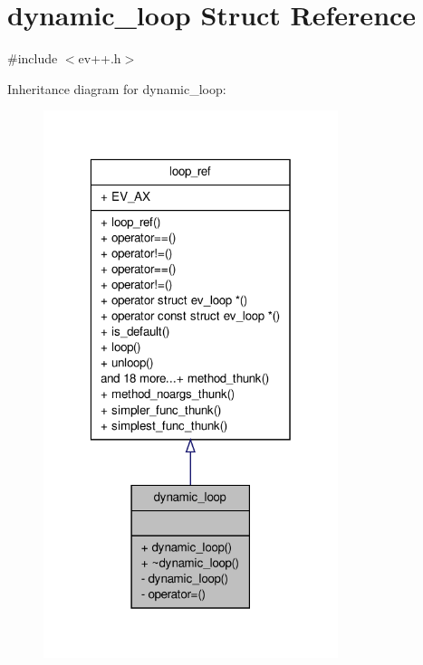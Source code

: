 \hypertarget{structev_1_1dynamic__loop}{\section{dynamic\-\_\-loop \-Struct \-Reference}
\label{structev_1_1dynamic__loop}
}


{\ttfamily \#include $<$ev++.\-h$>$}



\-Inheritance diagram for dynamic\-\_\-loop\-:
\nopagebreak
\begin{figure}[H]
\begin{center}
\leavevmode
\includegraphics[width=244pt]{structev_1_1dynamic__loop__inherit__graph}
\end{center}
\end{figure}


